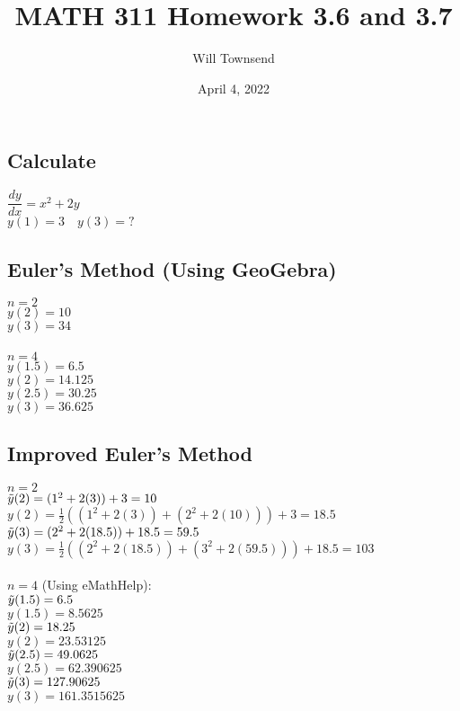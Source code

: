 \documentclass[12pt]{exam}
\title{\textbf{MATH 311 Homework 3.6 and 3.7}}
\author{Will Townsend}
\date{April 4, 2022}
\begin{document}
\maketitle

\begin{center}
    \section*{Calculate}
    $\dfrac{dy}{dx}=x^2+2y$\\
    $y(1)=3\quad y(3)=?$
\end{center}
\subsection*{Euler's Method (Using GeoGebra)}
$n=2$\\
$y(2)=10$\\
$y(3)=34$\\\\
$n=4$\\
$y(1.5)=6.5$\\
$y(2)=14.125$\\
$y(2.5)=30.25$\\
$y(3)=36.625$
\subsection*{Improved Euler's Method}
$n=2$\\
$\Tilde{y}(2)=(1^2+2(3))+3=10$\\
$y(2)=\frac{1}{2}((1^2+2(3))+(2^2+2(10)))+3=18.5$\\
$\Tilde{y}(3)=(2^2+2(18.5))+18.5=59.5$\\
$y(3)=\frac{1}{2}((2^2+2(18.5))+(3^2+2(59.5)))+18.5=103$\\\\
$n=4$ (Using eMathHelp):\\
$\Tilde{y}(1.5)=6.5$\\
$y(1.5)=8.5625$\\
$\Tilde{y}(2)=18.25$\\
$y(2)=23.53125$\\
$\Tilde{y}(2.5)=49.0625$\\
$y(2.5)=62.390625$\\
$\Tilde{y}(3)=127.90625$\\
$y(3)=161.3515625$
\end{document}
